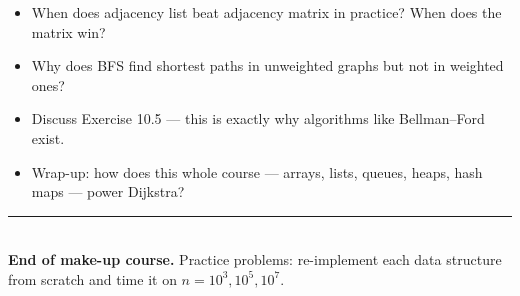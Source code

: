 \documentclass[11pt]{article}
\begin{document}
\begin{disbox}
\begin{itemize}[leftmargin=*]
  \item When does adjacency list beat adjacency matrix in practice? When does the matrix win?
  \item Why does BFS find shortest paths in unweighted graphs but not in weighted ones?
  \item Discuss Exercise 10.5 --- this is exactly why algorithms like Bellman--Ford exist.
  \item Wrap-up: how does this whole course --- arrays, lists, queues, heaps, hash maps --- power Dijkstra?
\end{itemize}
\end{disbox}

\vspace{1em}
\noindent
{\color{primary}\rule{\linewidth}{0.4pt}}\\
\textbf{End of make-up course.} Practice problems: re-implement each data structure from scratch and time it on $n = 10^3, 10^5, 10^7$.
\end{document}
